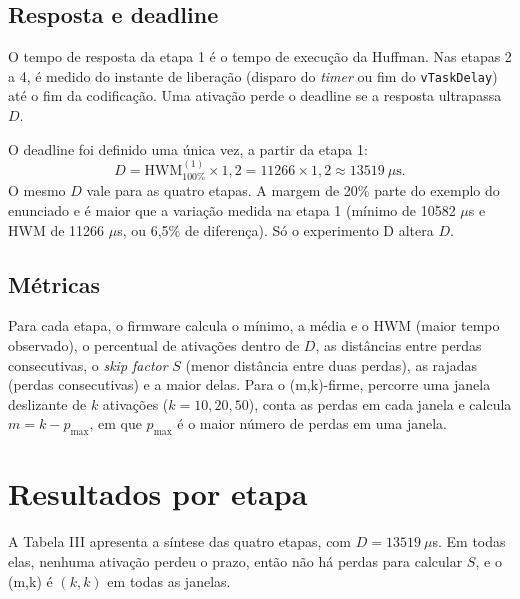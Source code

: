 \documentclass[conference,a4paper]{IEEEtran}
\begin{document}
\subsection{Resposta e deadline}
O tempo de resposta da etapa 1 é o tempo de execução da Huffman. Nas etapas 2 a 4, é medido do instante de liberação (disparo do \emph{timer} ou fim do \texttt{vTaskDelay}) até o fim da codificação. Uma ativação perde o deadline se a resposta ultrapassa $D$.

O deadline foi definido uma única vez, a partir da etapa 1:
\begin{equation}
D = \mathrm{HWM}_{100\%}^{(1)} \times 1{,}2 = 11266 \times 1{,}2 \approx 13519\ \mu\text{s}.
\end{equation}
O mesmo $D$ vale para as quatro etapas. A margem de 20\% parte do exemplo do enunciado e é maior que a variação medida na etapa 1 (mínimo de 10582 $\mu$s e HWM de 11266 $\mu$s, ou 6,5\% de diferença). Só o experimento D altera $D$.

\subsection{Métricas}
Para cada etapa, o firmware calcula o mínimo, a média e o HWM (maior tempo observado), o percentual de ativações dentro de $D$, as distâncias entre perdas consecutivas, o \emph{skip factor} $S$ (menor distância entre duas perdas), as rajadas (perdas consecutivas) e a maior delas. Para o (m,k)-firme, percorre uma janela deslizante de $k$ ativações ($k = 10, 20, 50$), conta as perdas em cada janela e calcula $m = k - p_{\max}$, em que $p_{\max}$ é o maior número de perdas em uma janela.

\section{Resultados por etapa}
A Tabela III apresenta a síntese das quatro etapas, com $D = 13519\ \mu$s. Em todas elas, nenhuma ativação perdeu o prazo, então não há perdas para calcular $S$, e o (m,k) é $(k,k)$ em todas as janelas.
\end{document}
